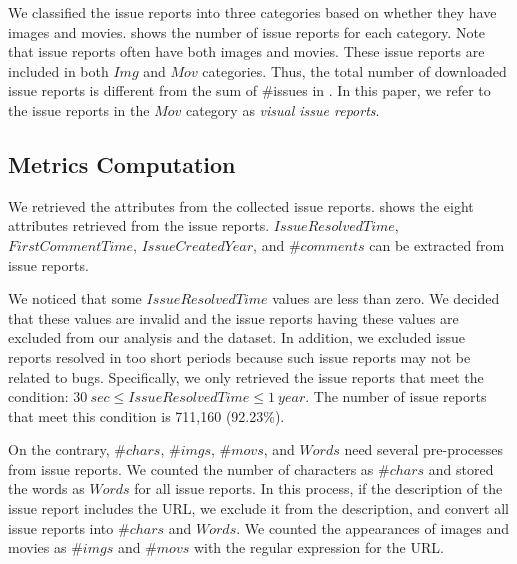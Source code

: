 We classified the issue reports into three categories based on whether they have images and movies.  shows the number of issue reports for each category. 
Note that issue reports often have both images and movies. 
These issue reports are included in both $Img$ and $Mov$ categories. 
Thus, the total number of downloaded issue reports is different from 
the sum of \#issues in . 
In this paper, we refer to the issue reports in the $Mov$ category 
as \textit{visual issue reports}. 



% 

\subsection{Metrics Computation}

We retrieved the attributes from the collected issue reports.
 shows the eight attributes 
retrieved from the issue reports. 
$IssueResolvedTime$, $FirstCommentTime$,
$IssueCreatedYear$, and $\#comments$ can be extracted from issue reports. 

We noticed that some $IssueResolvedTime$ values are less than zero. 
We decided that these values are invalid and the issue reports having 
these values are excluded from our analysis and the dataset. 
In addition, we excluded issue reports resolved in 
too short periods because such issue reports may not 
be related to bugs. 
Specifically, we only retrieved the issue reports that meet 
the condition: $30\ sec \leq IssueResolvedTime \leq 1\ year$.
The number of issue reports that meet this condition is 711,160 (92.23\%).

On the contrary, $\#chars$, $\#imgs$, $\#movs$, and $Words$ need several pre-processes from issue reports. 
We counted the number of characters as $\#chars$ and 
stored the words as $Words$ for all issue reports. 
In this process, if the description of the issue report 
includes the URL, we exclude it from the description, 
and convert all issue reports into $\#chars$ and $Words$.
We counted the appearances of images and movies
as $\#imgs$ and $\#movs$
with the regular expression for the URL.

